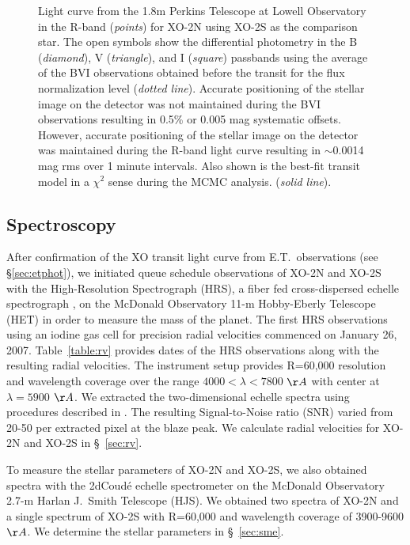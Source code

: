 \documentclass{emulateapj}
\newcommand{\xon}{XO-2}
\begin{document}
\begin{figure}
\caption{Light curve from the 1.8m Perkins Telescope at Lowell Observatory in the R-band ({\it points}) for \xon N using \xon S as the comparison star.  The open symbols show the differential photometry in the B ({\it diamond}), V ({\it triangle}), and I ({\it square}) passbands using the average of the BVI observations obtained before the transit for the flux normalization level ({\it dotted line}).   Accurate positioning of the stellar image on the detector was not maintained during the BVI observations resulting in 0.5\% or 0.005 mag systematic offsets.  However, accurate positioning of the stellar image on the detector was maintained during the R-band light curve resulting in $\sim$0.0014 mag rms over 1 minute intervals.  Also shown is the best-fit transit model in a $\chi^{2}$ sense during the MCMC analysis. ({\it solid line}). \label{janeslc}}
\end{figure}


\subsection{Spectroscopy}\label{sec:spectroscopy}
After confirmation of the XO transit light curve from E.T.\
observations (see \S\ref{sec:etphot}), we initiated queue schedule
observations of \xon N and \xon S with the High-Resolution
Spectrograph (HRS), a fiber fed cross-dispersed echelle spectrograph
\citep{TUL98}, on the McDonald Observatory 11-m Hobby-Eberly Telescope
(HET) in order to measure the mass of the planet.  The first HRS
observations using an iodine gas cell for precision radial velocities
commenced on January 26, 2007.  Table~\ref{table:rv} provides dates of
the HRS observations along with the resulting radial velocities.  The
instrument setup provides R=60,000 resolution and wavelength coverage
over the range $4000<\lambda<7800$ $\AA$ with center at $\lambda=5900$
$\AA$.  We extracted the two-dimensional echelle spectra using
procedures described in \citet{HIN00}.  The resulting Signal-to-Noise
ratio (SNR) varied from 20-50 per extracted pixel at the blaze peak.
We calculate radial velocities for \xon N and \xon S in
\S~\ref{sec:rv}.

To measure the stellar parameters of \xon N and \xon S, we also
obtained spectra with the 2dCoud\'{e} echelle spectrometer
\citep{TUL95} on the McDonald Observatory 2.7-m Harlan J.\ Smith
Telescope (HJS).  We obtained two spectra of \xon N and a single
spectrum of \xon S with R=60,000 and wavelength coverage of 3900-9600
$\AA$.  We determine the stellar parameters in \S~\ref{sec:sme}.
\end{document}
